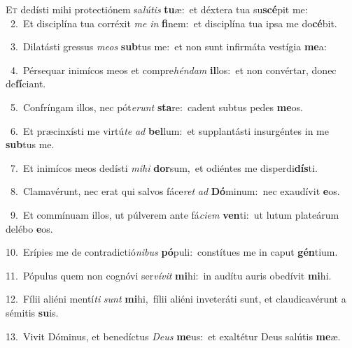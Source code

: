 \lettrine{\initial\textcolor{\initialcolor}{E}}{t} dedísti mihi protectiónem sa\-\textit{lú}\-\textit{tis} \textbf{tu}\-æ:~\star et déxtera tua su\-\textbf{scé}\-pit me:\\
{\numbfont\textcolor{\numbcolor}{~2.}}~Et disciplína tua corréxit \textit{me} \textit{in} \textbf{fi}\-nem:~\star et disciplína tua ipsa me do\-\textbf{cé}\-bit.\par
{\numbfont\textcolor{\numbcolor}{~3.}}~Dilatásti gressus \textit{me}\-\textit{os} \textbf{sub}\-tus me:~\star et non sunt infirmáta vestígia \textbf{me}\-a:\par
{\numbfont\textcolor{\numbcolor}{~4.}}~Pérsequar inimícos meos et compre\-\textit{hén}\-\textit{dam} \textbf{il}\-los:~\star et non convértar, donec de\-\textbf{fí}\-ciant.\par
{\numbfont\textcolor{\numbcolor}{~5.}}~Confríngam illos, nec pót\-\textit{e}\-\textit{runt} \textbf{sta}\-re:~\star cadent subtus pedes \textbf{me}\-os.\par
{\numbfont\textcolor{\numbcolor}{~6.}}~Et præcinxísti me virtú\textit{te} \textit{ad} \textbf{bel}\-lum:~\star et supplantásti insurgéntes in me \textbf{sub}\-tus me.\par
{\numbfont\textcolor{\numbcolor}{~7.}}~Et inimícos meos dedísti \textit{mi}\-\textit{hi} \textbf{dor}\-sum,~\star et odiéntes me disperdi\-\textbf{dís}\-ti.\par
{\numbfont\textcolor{\numbcolor}{~8.}}~Clamavérunt, nec erat qui salvos fáce\textit{ret} \textit{ad} \textbf{Dó}\-minum:~\star nec exaudívit \textbf{e}\-os.\par
{\numbfont\textcolor{\numbcolor}{~9.}}~Et commínuam illos, ut púlverem ante fá\-\textit{ci}\-\textit{em} \textbf{ven}\-ti:~\star ut lutum plateárum delébo \textbf{e}\-os.\par
{\numbfont\textcolor{\numbcolor}{10.}}~Erípies me de contradictió\-\textit{ni}\-\textit{bus} \textbf{pó}\-puli:~\star constítues me in caput \textbf{gén}\-tium.\par
{\numbfont\textcolor{\numbcolor}{11.}}~Pópulus quem non cognóvi ser\-\textit{ví}\-\textit{vit} \textbf{mi}\-hi:~\star in audítu auris obedívit \textbf{mi}\-hi.\par
{\numbfont\textcolor{\numbcolor}{12.}}~Fílii aliéni mentí\textit{ti} \textit{sunt} \textbf{mi}\-hi,~\star fílii aliéni inveteráti sunt, et claudicavérunt a sémitis \textbf{su}\-is.\par
{\numbfont\textcolor{\numbcolor}{13.}}~Vivit Dóminus, et benedíctus \textit{De}\-\textit{us} \textbf{me}\-us:~\star et exaltétur Deus salútis \textbf{me}\-æ.\par

